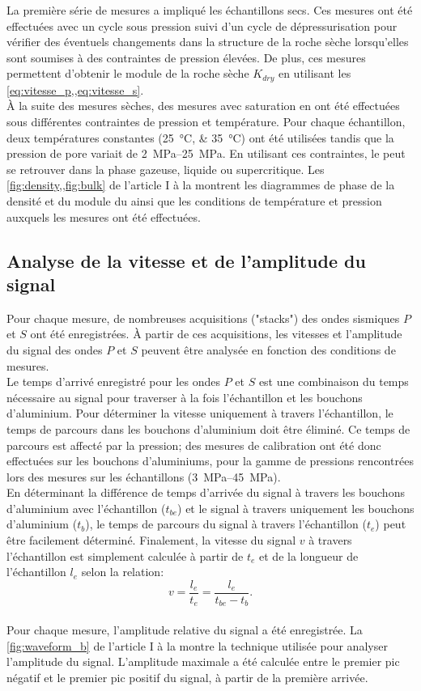 La première série de mesures a impliqué les échantillons secs. Ces mesures ont été effectuées avec un cycle sous pression suivi d'un cycle de dépressurisation pour vérifier des éventuels changements dans la structure de la roche sèche lorsqu'elles sont soumises à des contraintes de pression élevées. De plus, ces mesures permettent d'obtenir le module de la roche sèche $K_{dry}$ en utilisant les \cref{eq:vitesse_p,,eq:vitesse_s}.\\
À la suite des mesures sèches, des mesures avec saturation en  ont été effectuées sous différentes contraintes de pression et température. Pour chaque échantillon, deux températures constantes (\SIlist{25;35}{\degreeCelsius}) ont été utilisées tandis que la pression de pore variait de \SIrange{2}{25}{\mega\pascal}.
En utilisant ces contraintes, le  peut se retrouver dans la phase gazeuse, liquide ou supercritique. Les \cref{fig:density,,fig:bulk} de l'article I à la  montrent les diagrammes de phase de la densité et du module du  ainsi que les conditions de température et pression auxquels les mesures ont été effectuées.
\subsection{Analyse de la vitesse et de l’amplitude du signal}
Pour chaque mesure, de nombreuses acquisitions ("stacks") des ondes sismiques $P$ et $S$ ont été enregistrées. À partir de ces acquisitions, les vitesses et l’amplitude du signal des ondes $P$ et $S$ peuvent être analysée en fonction des conditions de mesures.\\
Le temps d’arrivé enregistré pour les ondes $P$ et $S$ est une combinaison du temps nécessaire au signal pour traverser à la fois l’échantillon et les bouchons d’aluminium. Pour déterminer la vitesse uniquement à travers l’échantillon, le temps de parcours dans les bouchons d’aluminium doit être éliminé. Ce temps de parcours est affecté par la pression; des mesures de calibration ont été donc effectuées sur les bouchons d’aluminiums, pour la gamme de pressions rencontrées lors des mesures sur les échantillons (\SIrange{3}{45}{\mega\pascal}).\\
En déterminant la différence de temps d’arrivée du signal à travers les bouchons d’aluminium avec l’échantillon ($t_{be}$) et le signal à travers uniquement les bouchons d’aluminium ($t_b$), le temps de parcours du signal à travers l’échantillon ($t_e$) peut être facilement déterminé. Finalement, la vitesse du signal $v$ à travers l’échantillon est simplement calculée à partir de $t_e$ et de la longueur de l’échantillon $l_e$ selon la relation:
\begin{equation}
v = \frac{l_e}{t_e} = \frac{l_e}{t_{be}-t_b}.
\end{equation}\\
Pour chaque mesure, l'amplitude relative du signal a été enregistrée. La \cref{fig:waveform_b} de l'article I à la  montre la technique utilisée pour analyser l'amplitude du signal. L'amplitude maximale a été calculée entre le premier pic négatif et le premier pic positif du signal, à partir de la première arrivée.
